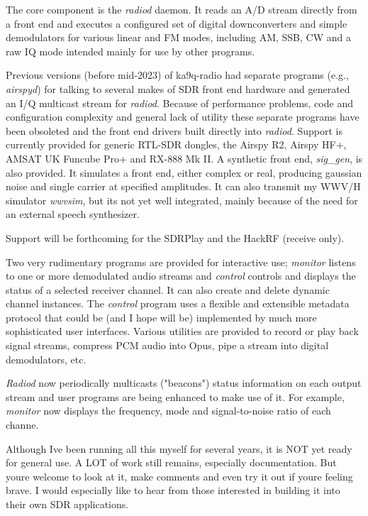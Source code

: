 The core component is the {\itshape radiod} daemon. It reads an A/D stream directly from a front end and executes a configured set of digital downconverters and simple demodulators for various linear and FM modes, including AM, SSB, CW and a raw IQ mode intended mainly for use by other programs.

Previous versions (before mid-\/2023) of ka9q-\/radio had separate programs (e.\+g., {\itshape airspyd}) for talking to several makes of SDR front end hardware and generated an I/Q multicast stream for {\itshape radiod}. Because of performance problems, code and configuration complexity and general lack of utility these separate programs have been obsoleted and the front end drivers built directly into {\itshape radiod}. Support is currently provided for generic RTL-\/\+SDR dongles, the Airspy R2, Airspy HF+, AMSAT UK Funcube Pro+ and RX-\/888 Mk II. A synthetic front end, {\itshape sig\+\_\+gen}, is also provided. It simulates a front end, either complex or real, producing gaussian noise and single carrier at specified amplitudes. It can also transmit my WWV/H simulator {\itshape wwvsim}, but it\textquotesingle{}s not yet well integrated, mainly because of the need for an external speech synthesizer.

Support will be forthcoming for the SDRPlay and the Hack\+RF (receive only).

Two very rudimentary programs are provided for interactive use; {\itshape monitor} listens to one or more demodulated audio streams and {\itshape control} controls and displays the status of a selected receiver channel. It can also create and delete dynamic channel instances. The {\itshape control} program uses a flexible and extensible metadata protocol that could be (and I hope will be) implemented by much more sophisticated user interfaces. Various utilities are provided to record or play back signal streams, compress PCM audio into Opus, pipe a stream into digital demodulators, etc.

{\itshape Radiod} now periodically multicasts ("{}beacons"{}) status information on each output stream and user programs are being enhanced to make use of it. For example, {\itshape monitor} now displays the frequency, mode and signal-\/to-\/noise ratio of each channe.

Although I\textquotesingle{}ve been running all this myself for several years, it is NOT yet ready for general use. A LOT of work still remains, especially documentation. But you\textquotesingle{}re welcome to look at it, make comments and even try it out if you\textquotesingle{}re feeling brave. I would especially like to hear from those interested in building it into their own SDR applications.

